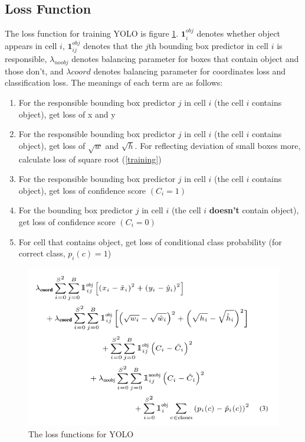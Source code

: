 \documentclass[extendedabs]{bmvc2k}
\begin{document}
\subsection{Loss Function}
The loss function for training YOLO is figure \ref{lossfunction}. $\mathbf{1}^{obj}_i$ denotes whether object appears in cell $i$, $\mathbf{1}^{obj}_{ij}$ denotes that the $j$th bounding box predictor in cell $i$ is responsible, $\lambda_{noobj} $ denotes balancing parameter for boxes that contain object and those don't, and $\lambda{coord}$ denotes balancing parameter for coordinates loss and classification loss. The meanings of each term are as follows:
\begin{enumerate}
    \item For the responsible bounding box predictor $j$ in cell $i$ (the cell $i$ contains object), get loss of x and y
    \item For the responsible bounding box predictor $j$ in cell $i$ (the cell $i$ contains object), get loss of $\sqrt{w}$ and $\sqrt{h}$. For reflecting deviation of small boxes more, calculate loss of square root (\ref{training})
    \item For the responsible bounding box predictor $j$ in cell $i$ (the cell $i$ contains object), get loss of confidence score $(C_i=1)$
    \item For the bounding box predictor $j$ in cell $i$ (the cell $i$ \textbf{doesn't} contain object), get loss of confidence score $(C_i=0)$
    \item For cell that contains object, get loss of conditional class probability (for correct class, $p_i(c)=1$)
\end{enumerate}

\begin{figure}[t]
	\includegraphics[width=\linewidth]{images/loss.PNG}
	\caption{
		The loss functions for YOLO}
	\vspace{-2mm}
 \label{lossfunction}
\end{figure}
\end{document}
